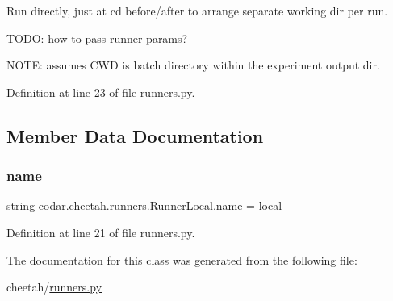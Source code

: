 \begin{DoxyVerb}Run directly, just at cd before/after to arrange separate working
dir per run.

TODO: how to pass runner params?

NOTE: assumes CWD is batch directory within the experiment output dir.
\end{DoxyVerb}
 

Definition at line 23 of file runners.\+py.



\subsection{Member Data Documentation}
\mbox{\label{classcodar_1_1cheetah_1_1runners_1_1_runner_local_a0456010ad8c87331e23127a490227bf1}} 
\subsubsection{\texorpdfstring{name}{name}}
{\footnotesize\ttfamily string codar.\+cheetah.\+runners.\+Runner\+Local.\+name = \textquotesingle{}local\textquotesingle{}\hspace{0.3cm}{\ttfamily [static]}}



Definition at line 21 of file runners.\+py.



The documentation for this class was generated from the following file\+:\begin{DoxyCompactItemize}
\item 
cheetah/\hyperlink{cheetah_2runners_8py}{runners.\+py}\end{DoxyCompactItemize}
